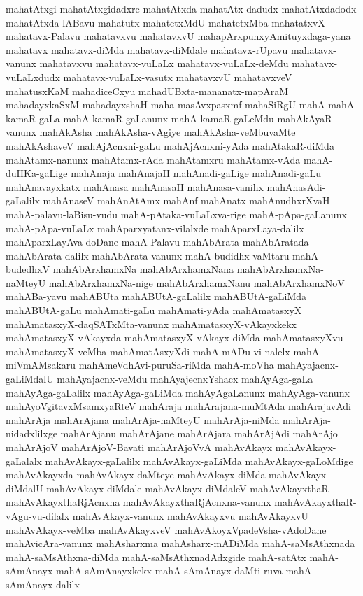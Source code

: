 {mahatAtxgi
mahatAtxgidadxre
mahatAtxda
mahatAtx-dadudx
mahatAtxdadodx
mahatAtxda-lABavu
mahatutx
mahatetxMdU
mahatetxMba
mahatatxvX
mahatavx-Palavu
mahatavxvu
mahatavxvU
mahapArxpunxyAmituyxdaga-yana
mahatavx
mahatavx-diMda
mahatavx-diMdale
mahatavx-rUpavu
mahatavx-vanunx
mahatavxvu
mahatavx-vuLaLx
mahatavx-vuLaLx-deMdu
mahatavx-vuLaLxdudx
mahatavx-vuLaLx-vasutx
mahatavxvU
mahatavxveV
mahatusxKaM
mahadiceCxyu
mahadUBxta-mananatx-mapAraM
mahadayxkaSxM
mahadayxshaH
maha-masAvxpasxmf
mahaSiRgU
mahA
mahA-kamaR-gaLa
mahA-kamaR-gaLanunx
mahA-kamaR-gaLeMdu
mahAkAyaR-vanunx
mahAkAsha
mahAkAsha-vAgiye
mahAkAsha-veMbuvaMte
mahAkAshaveV
mahAjAcnxni-gaLu
mahAjAcnxni-yAda
mahAtakaR-diMda
mahAtamx-nanunx
mahAtamx-rAda
mahAtamxru
mahAtamx-vAda
mahA-duHKa-gaLige
mahAnaja
mahAnajaH
mahAnadi-gaLige
mahAnadi-gaLu
mahAnavayxkatx
mahAnasa
mahAnasaH
mahAnasa-vanihx
mahAnasAdi-gaLalilx
mahAnaseV
mahAnAtAmx
mahAnf
mahAnatx
mahAnudhxrXvaH
mahA-palavu-laBisu-vudu
mahA-pAtaka-vuLaLxva-rige
mahA-pApa-gaLanunx
mahA-pApa-vuLaLx
mahAparxyatanx-vilalxde
mahAparxLaya-dalilx
mahAparxLayAva-doDane
mahA-Palavu
mahAbArata
mahAbAratada
mahAbArata-dalilx
mahAbArata-vanunx
mahA-budidhx-vaMtaru
mahA-budedhxV
mahAbArxhamxNa
mahAbArxhamxNana
mahAbArxhamxNa-naMteyU
mahAbArxhamxNa-nige
mahAbArxhamxNanu
mahAbArxhamxNoV
mahABa-yavu
mahABUta
mahABUtA-gaLalilx
mahABUtA-gaLiMda
mahABUtA-gaLu
mahAmati-gaLu
mahAmati-yAda
mahAmatasxyX
mahAmatasxyX-daqSATxMta-vanunx
mahAmatasxyX-vAkayxkekx
mahAmatasxyX-vAkayxda
mahAmatasxyX-vAkayx-diMda
mahAmatasxyXvu
mahAmatasxyX-veMba
mahAmatAsxyXdi
mahA-mADu-vi-nalelx
mahA-miVmAMsakaru
mahAmeVdhAvi-puruSa-riMda
mahA-moVha
mahAyajacnx-gaLiMdalU
mahAyajacnx-veMdu
mahAyajecnxYshacx
mahAyAga-gaLa
mahAyAga-gaLalilx
mahAyAga-gaLiMda
mahAyAgaLanunx
mahAyAga-vanunx
mahAyoVgitavxMsamxyaRteV
mahAraja
mahArajana-muMtAda
mahArajavAdi
mahArAja
mahArAjana
mahArAja-naMteyU
mahArAja-niMda
mahArAja-nidadxlilxge
mahArAjanu
mahArAjane
mahArAjara
mahArAjAdi
mahArAjo
mahArAjoV
mahArAjoV-Bavati
mahArAjoVvA
mahAvAkayx
mahAvAkayx-gaLalalx
mahAvAkayx-gaLalilx
mahAvAkayx-gaLiMda
mahAvAkayx-gaLoMdige
mahAvAkayxda
mahAvAkayx-daMteye
mahAvAkayx-diMda
mahAvAkayx-diMdalU
mahAvAkayx-diMdale
mahAvAkayx-diMdaleV
mahAvAkayxthaR
mahAvAkayxthaRjAcnxna
mahAvAkayxthaRjAcnxna-vanunx
mahAvAkayxthaR-vAgu-vu-dilalx
mahAvAkayx-vanunx
mahAvAkayxvu
mahAvAkayxvU
mahAvAkayx-veMba
mahAvAkayxveV
mahAvAkoyxVpadeVsha-vAdoDane
mahAvicAra-vanunx
mahAsharxma
mahAsharx-mADiMda
mahA-saMsAthxnada
mahA-saMsAthxna-diMda
mahA-saMsAthxnadAdxgide
mahA-satAtx
mahA-sAmAnayx
mahA-sAmAnayxkekx
mahA-sAmAnayx-daMti-ruva
mahA-sAmAnayx-dalilx
}
